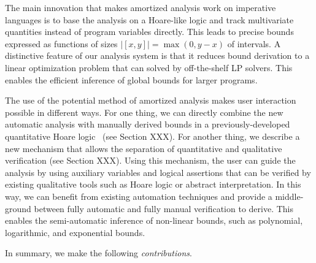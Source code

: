 \documentclass[nocopyrightspace,preprint]{sigplanconf}
\begin{document}
The main innovation that makes amortized analysis work
on imperative languages is to base the analysis on a
Hoare-like logic and track multivariate quantities instead
of program variables directly.  This leads to precise bounds
expressed as functions of sizes $|[x, y]| = \max(0, y-x)$ of
intervals. A distinctive feature of our analysis system is that
it reduces bound derivation to a linear optimization problem
that can solved by off-the-shelf LP solvers.  This enables the
efficient inference of global bounds for larger programs.

The use of the potential method of amortized analysis makes user
interaction possible in different ways. For one thing, we can directly
combine the new automatic analysis with manually derived bounds in a
previously-developed quantitative Hoare logic~\cite{veristack14} (see
Section XXX).  For another thing, we describe a new mechanism that
allows the separation of quantitative and qualitative verification
(see Section XXX).  Using this mechanism, the user can guide the
analysis by using auxiliary variables and logical assertions that can
be verified by existing qualitative tools such as Hoare logic or
abstract interpretation.  In this way, we can benefit from existing
automation techniques and provide a middle-ground between fully
automatic and fully manual verification to derive. This enables the
semi-automatic inference of non-linear bounds, such as polynomial,
logarithmic, and exponential bounds.



In summary, we make the following \emph{contributions}.
\end{document}

